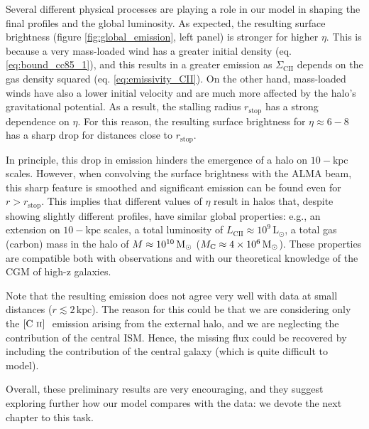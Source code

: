 Several different physical processes are playing a role in our model in shaping the final profiles and the global \CII luminosity. As expected, the resulting surface brightness (figure \ref{fig:global_emission}, left panel) is stronger for higher $\eta$. This is because a very mass-loaded wind has a greater initial density (eq. \ref{eq:bound_cc85_1}), and this results in a greater \CII emission as $\Sigma_\mathrm{CII}$ depends on the gas density squared (eq. \ref{eq:emissivity_CII}). On the other hand, mass-loaded winds have also a lower initial velocity and are much more affected by the halo's gravitational potential. As a result, the stalling radius $r_\mathrm{stop}$ has a strong dependence on $\eta$. For this reason, the resulting surface brightness for $\eta \approx 6-8$ has a sharp drop for distances close to $r_\mathrm{stop}$. 

In principle, this drop in emission hinders the emergence of a \CII halo on $10-\mathrm{kpc}$ scales. However, when convolving the surface brightness with the ALMA beam, this sharp feature is smoothed and significant \CII emission can be found even for $r>r_\mathrm{stop}$. This implies that different values of $\eta$ result in halos that, despite showing slightly different profiles, have similar global properties: e.g., an extension on $10-\mathrm{kpc}$ scales, a total \CII luminosity of $L_\mathrm{CII}\approx 10^9\,\mathrm{L}_\odot$, a total gas (carbon) mass in the halo of $M\approx 10^{10} \,{\rm M}_{\odot}$ ($M_\mathrm{C}\approx 4\times10^6 \,{\rm M}_{\odot}$). These properties are compatible both with observations and with our theoretical knowledge of the CGM of high-z galaxies. 

Note that the resulting emission does not agree very well with data at small distances ($r\lesssim 2\,\mathrm{kpc}$). The reason for this could be that we are considering only the $\hbox{[C~$\scriptstyle\rm II $]~}$ emission arising from the external halo, and we are neglecting the contribution of the central ISM. Hence, the missing flux could be recovered by including the contribution of the central galaxy (which is quite difficult to model).

Overall, these preliminary results are very encouraging, and they suggest exploring further how our model compares with the data: we devote the next chapter to this task. 





